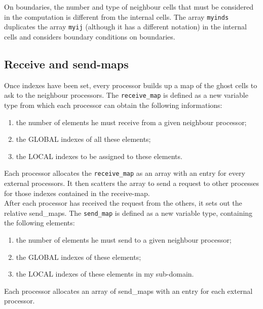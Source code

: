 On boundaries, the number and type of neighbour cells that must be considered
in the computation is different from the internal cells. The array
{\tt myinds} duplicates the array {\tt myij} (although it has a different notation)
in the internal cells and considers boundary conditions on boundaries.\\ 
%
\subsection{Receive and send-maps}
%
Once indexes have been set, every processor builds up a map of the ghost cells
to ask to the neighbour processors. The {\tt receive\_map} is 
defined as a new variable type from which each processor can obtain the following informations:
\begin{enumerate}
\item the number of elements he must receive from a given neighbour processor;
\item the GLOBAL indexes of all these elements;
\item the LOCAL indexes to be assigned to these elements.
\end{enumerate}
Each processor allocates the {\tt receive\_map} as an array with an entry for every 
external processors. It then scatters the array to send a request to other 
processes for those indexes contained in the receive-map.\\
After each processor has received the request from the others,
it sets out the relative send\_maps. The {\tt send\_map} is defined as a new variable
type, containing the following elements:
\begin{enumerate}
\item the number of elements he must send to a given neighbour processor;
\item the GLOBAL indexes of these elements;
\item the LOCAL indexes of these elements in my sub-domain.
\end{enumerate}
Each processor allocates an array of send\_maps with an entry for each external processor.
%
